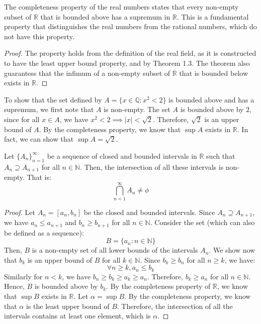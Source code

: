 \documentclass[openany]{book}
\begin{document}
\begin{mytheorem}
The completeness property of the real numbers states that every non-empty subset of $\mathbb{R}$ that is bounded above has a supremum in $\mathbb{R}$. This is a fundamental property that distinguishes the real numbers from the rational numbers, which do not have this property. 
\end{mytheorem}
\begin{proof}
The property holds from the definition of the real field, as it is constructed to have the least upper bound property, and by Theorem 1.3. The theorem also guarantess that the infimum of a non-empty subset of $\mathbb{R}$ that is bounded below exists in $\mathbb{R}$.
\end{proof}
\begin{example}
To show that the set defined by $A = \{x \in \mathbb{Q}: x^2 < 2\}$ is bounded above and has a supremum, we first note that $A$ is non-empty. The set $A$ is bounded above by $2$, since for all $x \in A$, we have $x^2 < 2 \implies |x| < \sqrt{2}$. Therefore, $\sqrt{2}$ is an upper bound of $A$. By the completeness property, we know that $\sup A$ exists in $\mathbb{R}$. In fact, we can show that $\sup A = \sqrt{2}$.
\end{example}
\begin{mytheorem}
Let $\{A_n\}_{n=1}^{\infty}$ be a sequence of closed and bounded intervals in $\mathbb{R}$ such that $A_n \supseteq A_{n+1}$ for all $n \in \mathbb{N}$. Then, the intersection of all these intervals is non-empty. That is:
$$\bigcap_{n=1}^{\infty} A_n \neq \phi$$
\end{mytheorem}
\begin{proof}
Let $A_n = [a_n, b_n]$ be the closed and bounded intervals. Since $A_n \supseteq A_{n+1}$, we have $a_n \leq a_{n+1}$ and $b_n \geq b_{n+1}$ for all $n \in \mathbb{N}$. Consider the set (which can also be defined as a sequence): 
$$B = \{a_n: n \in \mathbb{N}\}$$
Then, $B$ is a non-empty set of all lower bounds of the intervals $A_n$. We show now that $b_k$ is an upper bound of $B$ for all $k \in \mathbb{N}$. Since $b_k \geq b_n$ for all $n \geq k$, we have:
$$\forall n \geq k, a_n \leq b_k$$
Similarly for $n < k$, we have $b_n \geq b_k \geq a_k \geq a_n$. Therefore, $b_k \geq a_n$ for all $n \in \mathbb{N}$. Hence, $B$ is bounded above by $b_k$. By the completeness property of $\mathbb{R}$, we know that $\sup B$ exists in $\mathbb{R}$. Let $\alpha = \sup B$. By the completeness property, we know that $\alpha$ is the least upper bound of $B$. Therefore, the intersection of all the intervals contains at least one element, which is $\alpha$.

\end{proof}
\end{document}
